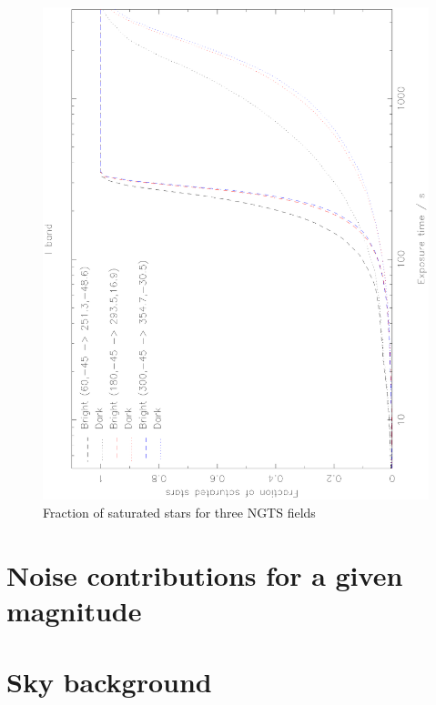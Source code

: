 \documentclass[a4paper]{report}
\begin{document}
\begin{figure}
    \begin{center}
        \includegraphics[angle=270,width=0.9\columnwidth]{images/fractionsaturated}
    \end{center}
    \caption{Fraction of saturated stars for three NGTS fields}
    \label{fig:fractionsaturated}
\end{figure}

\section{Noise contributions for a given magnitude}

\appendix
\section{Sky background}






\end{document}
